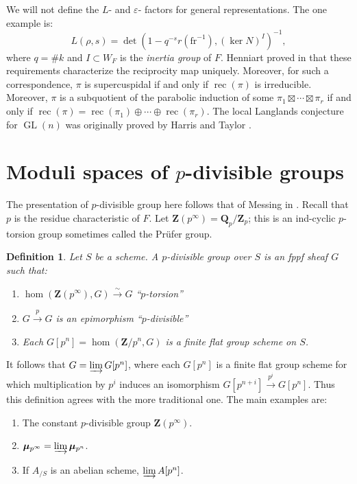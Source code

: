 \documentclass{article}
\DeclareMathOperator{\GL}{GL}
\DeclareMathOperator{\reciprocity}{rec}
\newcommand{\frob}{\mathrm{fr}} %
\newcommand{\iso}{\xrightarrow\sim}
\newcommand{\dmu}{\bm\mu}
\newcommand{\dQ}{\mathbf{Q}}
\newcommand{\dZ}{\mathbf{Z}}
\newtheorem{definition}[subsection]{Definition}
\begin{document}
We will not define the $L$- and $\varepsilon$- factors for general 
representations. The one example is: 
\[
  L(\rho,s) = \det\left(1-q^{-s} r(\frob^{-1}), (\ker N)^I\right)^{-1} ,
\]
where $q=\# k$ and $I\subset W_F$ is the \emph{inertia group} of $F$.  
Henniart proved in \cite{henniart-1993} that these requirements characterize 
the reciprocity map uniquely. Moreover, for such a correspondence, $\pi$ is 
supercuspidal if and only if $\reciprocity(\pi)$ is irreducible. Moreover, 
$\pi$ is a subquotient of the parabolic induction of some 
$\pi_1\boxtimes\cdots\boxtimes \pi_r$ if and only if 
$\reciprocity(\pi) = \reciprocity(\pi_1)\oplus \cdots \oplus \reciprocity(\pi_r)$. 
The local Langlands conjecture for $\GL(n)$ was originally proved by 
Harris and Taylor \cite{harris-taylor-2001}. 





\section{Moduli spaces of \texorpdfstring{$p$}{p}-divisible groups}

The presentation of $p$-divisible group here follows that of 
Messing in \cite{messing-1972}. Recall that $p$ is the residue characteristic 
of $F$. Let $\dZ(p^\infty)=\dQ_p/\dZ_p$; this is an ind-cyclic $p$-torsion 
group sometimes called the Pr\"ufer group. 

\begin{definition}
Let $S$ be a scheme. A \emph{$p$-divisible group} over $S$ is an fppf 
sheaf $G$ such that: 
\begin{enumerate}
  \item $\hom(\dZ(p^\infty),G)\iso G$ ``$p$-torsion''
  \item $G\xrightarrow p G$ is an epimorphism ``$p$-divisible''
  \item Each $G[p^n]=\hom(\dZ/p^n,G)$ is a finite flat group scheme on $S$. 
\end{enumerate}
\end{definition}

It follows that $G=\varinjlim G[p^n]$, where each $G[p^n]$ is a finite flat 
group scheme for which multiplication by $p^i$ induces an isomorphism 
$G[p^{n+i}]\xrightarrow{p^i}G[p^n]$. Thus this definition agrees with the more 
traditional one. The main examples are: 
\begin{enumerate}
  \item The constant $p$-divisible group $\dZ(p^\infty)$. 
  \item $\dmu_{p^\infty} = \varinjlim \dmu_{p^n}$. 
  \item If $A_{/S}$ is an abelian scheme, $\varinjlim A[p^n]$. 
\end{enumerate}
\end{document}
